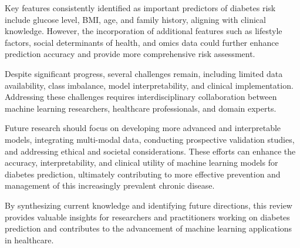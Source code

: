 \documentclass[journal]{IEEEtran}
\begin{document}
Key features consistently identified as important predictors of diabetes risk include glucose level, BMI, age, and family history, aligning with clinical knowledge. However, the incorporation of additional features such as lifestyle factors, social determinants of health, and omics data could further enhance prediction accuracy and provide more comprehensive risk assessment.

Despite significant progress, several challenges remain, including limited data availability, class imbalance, model interpretability, and clinical implementation. Addressing these challenges requires interdisciplinary collaboration between machine learning researchers, healthcare professionals, and domain experts.

Future research should focus on developing more advanced and interpretable models, integrating multi-modal data, conducting prospective validation studies, and addressing ethical and societal considerations. These efforts can enhance the accuracy, interpretability, and clinical utility of machine learning models for diabetes prediction, ultimately contributing to more effective prevention and management of this increasingly prevalent chronic disease.

By synthesizing current knowledge and identifying future directions, this review provides valuable insights for researchers and practitioners working on diabetes prediction and contributes to the advancement of machine learning applications in healthcare.
\end{document}
